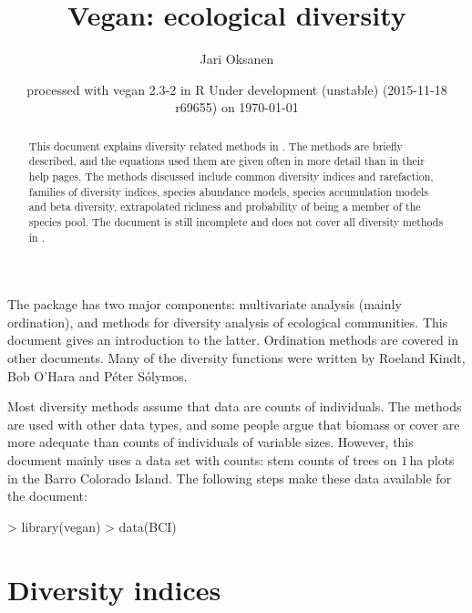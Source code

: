 \documentclass[a4paper,10pt,twocolumn]{article}
\title{Vegan: ecological diversity} \author{Jari Oksanen}
\date{\footnotesize{
  processed with vegan 2.3-2
  in R Under development (unstable) (2015-11-18 r69655) on \today}}
\begin{document}




\maketitle
\begin{abstract} 
  This document explains diversity related methods in
  . The methods are briefly described, and the equations
  used them are given often in more detail than in their help
  pages. The methods discussed include common diversity indices and
  rarefaction, families of diversity indices, species abundance
  models, species accumulation models and beta diversity, extrapolated
  richness and probability of being a member of the species pool. The
  document is still incomplete and does not cover all diversity
  methods in .
\end{abstract}
\tableofcontents


\noindent The  package has two major components:
multivariate analysis (mainly ordination), and methods for diversity
analysis of ecological communities.  This document gives an
introduction to the latter.  Ordination methods are covered in other
documents.  Many of the diversity functions were written by Roeland
Kindt, Bob O'Hara and P{\'e}ter S{\'o}lymos.

Most diversity methods assume that data are counts of individuals.
The methods are used with other data types, and some people argue that
biomass or cover are more adequate than counts of individuals of
variable sizes.  However, this document mainly uses a data set with
counts: stem counts of trees on $1$\,ha plots in the Barro Colorado
Island.  The following steps make these data available for the
document:
\begin{Schunk}
\begin{Sinput}
> library(vegan)
> data(BCI)
\end{Sinput}
\end{Schunk}

\section{Diversity indices}
\end{document}

